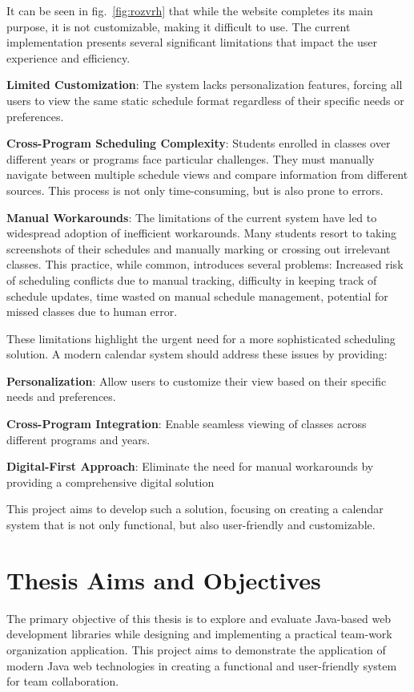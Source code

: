 It can be seen in fig.~\ref{fig:rozvrh} that while the website completes its main purpose, it is not customizable, making it difficult to use.
The current implementation presents several significant limitations that impact the user experience and efficiency.

\textbf{Limited Customization}: The system lacks personalization features, forcing all users to view the same static schedule format regardless of their specific needs or preferences.

\textbf{Cross-Program Scheduling Complexity}: Students enrolled in classes over different years or programs face particular challenges.
They must manually navigate between multiple schedule views and compare information from different sources.
This process is not only time-consuming, but is also prone to errors.

\textbf{Manual Workarounds}: The limitations of the current system have led to widespread adoption of inefficient workarounds.
Many students resort to taking screenshots of their schedules and manually marking or crossing out irrelevant classes.
This practice, while common, introduces several problems:
Increased risk of scheduling conflicts due to manual tracking,
difficulty in keeping track of schedule updates,
time wasted on manual schedule management,
potential for missed classes due to human error.


These limitations highlight the urgent need for a more sophisticated scheduling solution.
A modern calendar system should address these issues by providing:

\textbf{Personalization}: Allow users to customize their view based on their specific needs and preferences.

\textbf{Cross-Program Integration}: Enable seamless viewing of classes across different programs and years.

\textbf{Digital-First Approach}: Eliminate the need for manual workarounds by providing a comprehensive digital solution

This project aims to develop such a solution, focusing on creating a calendar system that is not only functional, but also user-friendly and customizable.


\section{Thesis Aims and Objectives}\label{sec:thesis-aims}
The primary objective of this thesis is to explore and evaluate Java-based web development libraries while designing and implementing a practical team-work organization application.
This project aims to demonstrate the application of modern Java web technologies in creating a functional and user-friendly system for team collaboration.

